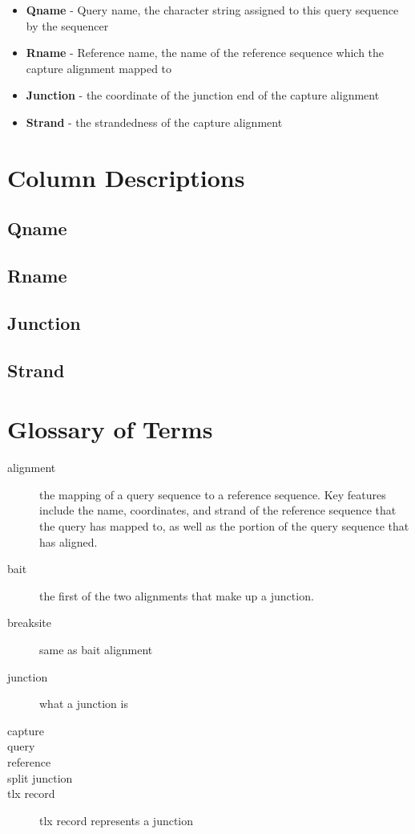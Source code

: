 \documentclass{article}
\begin{document}
\begin{itemize}
  \item \textbf{Qname} - Query name, the character string assigned to this query sequence by the sequencer
  \item \textbf{Rname} - Reference name, the name of the reference sequence which the capture alignment mapped to
  \item \textbf{Junction} - the coordinate of the junction end of the capture alignment
  \item \textbf{Strand} - the strandedness of the capture alignment 
\end{itemize}

\section{Column Descriptions}
\subsection*{Qname}
\subsection*{Rname}
\subsection*{Junction}
\subsection*{Strand}


\section{Glossary of Terms}

\begin{description}

  \item[alignment] the mapping of a query sequence to a reference sequence. Key features include the name, coordinates, and strand of the reference sequence that the query has mapped to, as well as the portion of the query sequence that has aligned.
  \item[bait] the first of the two alignments that make up a junction.
  \item[breaksite] same as bait alignment
  \item[junction] what a junction is
  \item[capture]
  \item[query]
  \item[reference]
  \item[split junction]
  \item[tlx record] tlx record represents a junction

\end{description}
\end{document}
